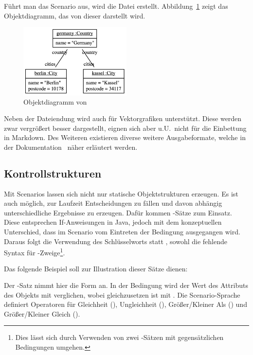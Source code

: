 Führt man das Scenario aus, wird die Datei  erstellt.
Abbildung~\ref{fig:germany.png} zeigt das Objektdiagramm, das von dieser darstellt wird.

\begin{figure}
    \centering
    \includegraphics[width=0.5\textwidth]{chapter/fulib-scenarios/img/germany.png}
    \caption{Objektdiagramm von }
    \label{fig:germany.png}
\end{figure}

Neben der Dateiendung  wird auch  für Vektorgrafiken unterstützt.
Diese werden zwar vergrößert besser dargestellt, eignen sich aber u.U.\ nicht für die Einbettung in Markdown.
Des Weiteren existieren diverse weitere Ausgabeformate, welche in der Dokumentation~\cite[Language.Sentences.Test Sentences.Diagram Sentences]{documentation} näher erläutert werden.

\subsection{Kontrollstrukturen}\label{subsec:control-structures}

Mit Scenarios lassen sich nicht nur statische Objektstrukturen erzeugen.
Es ist auch möglich, zur Laufzeit Entscheidungen zu fällen und davon abhängig unterschiedliche Ergebnisse zu erzeugen.
Dafür kommen -Sätze zum Einsatz.
Diese entsprechen If-Anweisungen in Java, jedoch mit dem konzeptuellen Unterschied,
dass im Scenario vom Eintreten der Bedingung ausgegangen wird.
Daraus folgt die Verwendung des Schlüsselworts  statt ,
sowohl die fehlende Syntax für -Zweige\footnote{
Dies lässt sich durch Verwenden von zwei -Sätzen mit gegensätzlichen Bedingungen umgehen.
}.

Das folgende Beispiel soll zur Illustration dieser Sätze dienen:


Der -Satz nimmt hier die Form  an.
In der Bedingung wird der Wert des Attributs  des Objekts  mit  verglichen, wobei  gleichzusetzen ist mit \code{<}.
Die Scenario-Sprache definiert Operatoren für Gleichheit (), Ungleichheit (), Größer/Kleiner Als () und Größer/Kleiner Gleich ().

